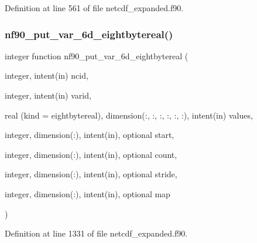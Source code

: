 Definition at line 561 of file netcdf\+\_\+expanded.\+f90.

\mbox{\label{netcdf__expanded_8f90_a94deba4e6c99586106fb2328c68abdf0}} 
\subsubsection{\texorpdfstring{nf90\+\_\+put\+\_\+var\+\_\+6d\+\_\+eightbytereal()}{nf90\_put\_var\_6d\_eightbytereal()}}
{\footnotesize\ttfamily integer function nf90\+\_\+put\+\_\+var\+\_\+6d\+\_\+eightbytereal (\begin{DoxyParamCaption}\item[{integer, intent(in)}]{ncid,  }\item[{integer, intent(in)}]{varid,  }\item[{real (kind = eightbytereal), dimension(\+:, \+:, \+:, \+:, \+:, \+:), intent(in)}]{values,  }\item[{integer, dimension(\+:), intent(in), optional}]{start,  }\item[{integer, dimension(\+:), intent(in), optional}]{count,  }\item[{integer, dimension(\+:), intent(in), optional}]{stride,  }\item[{integer, dimension(\+:), intent(in), optional}]{map }\end{DoxyParamCaption})}



Definition at line 1331 of file netcdf\+\_\+expanded.\+f90.

\mbox{\label{netcdf__expanded_8f90_a5f799517352067e15b1cf6f13986f022}} 
